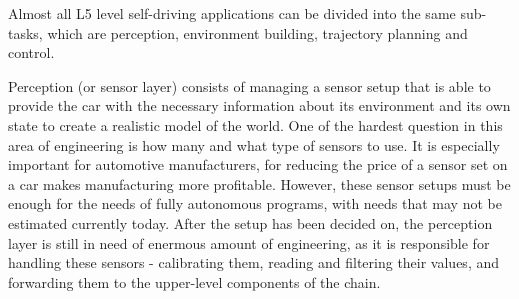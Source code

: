 Almost all L5 level self-driving applications can be divided into the same sub-tasks, which are perception, environment building, trajectory planning and control.

Perception (or sensor layer) consists of managing a sensor setup that is able to provide the car with the necessary information about its environment and its own state to create a realistic model of the world. One of the hardest question in this area of engineering is how many and what type of sensors to use. It is especially important for automotive manufacturers, for reducing the price of a sensor set on a car makes manufacturing more profitable. However, these sensor setups must be enough for the needs of fully autonomous programs, with needs that may not be estimated currently today. After the setup has been decided on, the perception layer is still in need of enermous amount of engineering, as it is responsible for handling these sensors - calibrating them, reading and filtering their values, and forwarding them to the upper-level components of the chain.

 